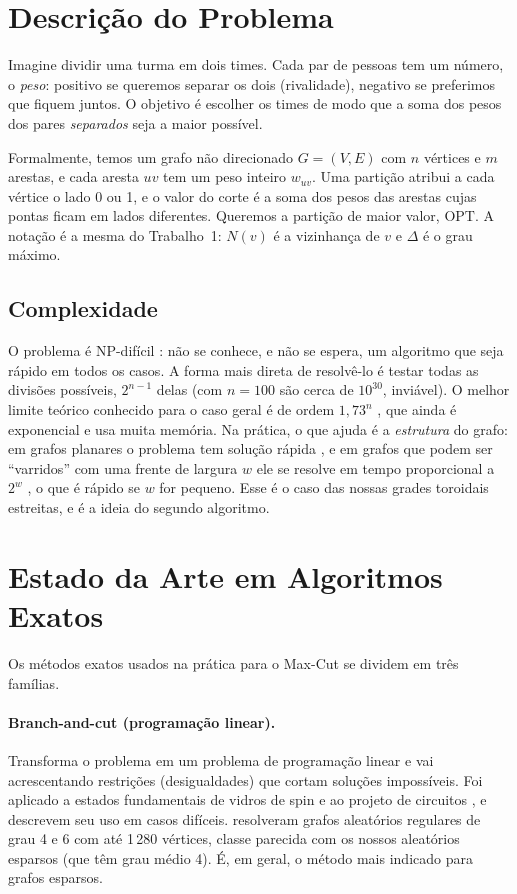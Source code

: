 \section{Descrição do Problema}

Imagine dividir uma turma em dois times. Cada par de pessoas tem um número, o \emph{peso}: positivo se queremos separar os dois (rivalidade), negativo se preferimos que fiquem juntos. O objetivo é escolher os times de modo que a soma dos pesos dos pares \emph{separados} seja a maior possível.

Formalmente, temos um grafo não direcionado $G=(V,E)$ com $n$ vértices e $m$ arestas, e cada aresta $uv$ tem um peso inteiro $w_{uv}$. Uma partição atribui a cada vértice o lado 0 ou 1, e o valor do corte é a soma dos pesos das arestas cujas pontas ficam em lados diferentes. Queremos a partição de maior valor, $\mathrm{OPT}$. A notação é a mesma do Trabalho~1: $N(v)$ é a vizinhança de $v$ e $\Delta$ é o grau máximo.

\subsection{Complexidade}

O problema é NP-difícil \cite{Karp 1972, Garey et al. 1976}: não se conhece, e não se espera, um algoritmo que seja rápido em todos os casos. A forma mais direta de resolvê-lo é testar todas as divisões possíveis, $2^{n-1}$ delas (com $n=100$ são cerca de $10^{30}$, inviável). O melhor limite teórico conhecido para o caso geral é de ordem $1{,}73^n$ \cite{Williams 2005}, que ainda é exponencial e usa muita memória. Na prática, o que ajuda é a \emph{estrutura} do grafo: em grafos planares o problema tem solução rápida \cite{Hadlock 1975}, e em grafos que podem ser ``varridos'' com uma frente de largura $w$ ele se resolve em tempo proporcional a $2^{w}$ \cite{Arnborg et al. 1991, Bodlaender 1993}, o que é rápido se $w$ for pequeno. Esse é o caso das nossas grades toroidais estreitas, e é a ideia do segundo algoritmo.

\section{Estado da Arte em Algoritmos Exatos}

Os métodos exatos usados na prática para o Max-Cut se dividem em três famílias.

\paragraph{Branch-and-cut (programação linear).} Transforma o problema em um problema de programação linear e vai acrescentando restrições (desigualdades) que cortam soluções impossíveis. Foi aplicado a estados fundamentais de vidros de spin e ao projeto de circuitos \cite{Barahona et al. 1988}, e \citet{Liers et al. 2004} descrevem seu uso em casos difíceis. \citet{Liers et al. 2003} resolveram grafos aleatórios regulares de grau 4 e 6 com até 1\,280 vértices, classe parecida com os nossos aleatórios esparsos (que têm grau médio 4). É, em geral, o método mais indicado para grafos esparsos.

